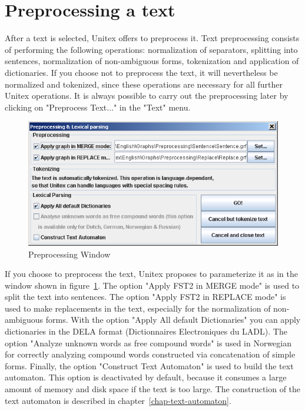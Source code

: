  

\section{Preprocessing a text}
After a text is selected, Unitex offers to preprocess it. Text preprocessing
consists of performing the following operations: normalization of separators,
splitting into sentences, normalization of non-ambiguous forms, tokenization and 
application of dictionaries. If you choose not to preprocess the text, it 
will nevertheless be normalized and tokenized, since
these operations are necessary for all further Unitex operations. It is always
possible to carry out the preprocessing later by clicking on "Preprocess Text..."
in the "Text" menu. 

\begin{figure}[!h]
\begin{center}
\includegraphics[width=15cm]{resources/img/fig2-9.png}
\caption{Preprocessing Window\label{fig-preprocessing-frame}}
\end{center}
\end{figure}

\bigskip
\noindent 
If you choose to preprocess the text, Unitex proposes to parameterize it
as in the window shown in figure~\ref{fig-preprocessing-frame}.
The option "Apply FST2 in MERGE mode" is used to split the text into sentences.
The option "Apply FST2 in REPLACE mode" is used to make replacements in the text,
especially for the normalization of non-ambiguous forms. With the option "Apply
All default Dictionaries" you can apply dictionaries in the DELA format
(Dictionnaires Electroniques du LADL). The option "Analyze unknown
words as free compound words" is used in Norwegian for correctly analyzing
compound words  constructed via concatenation of simple forms.  Finally, the
option "Construct Text Automaton" is used to build the text automaton. This
option is deactivated by default, because it consumes a large amount of memory
and disk space if the text is too large. The construction of the text automaton
is described in chapter~\ref{chap-text-automaton}.

